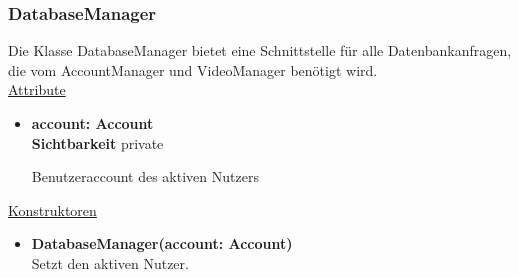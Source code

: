 \subsubsection{DatabaseManager} \label{service:klasse:DatabaseManager}
Die Klasse DatabaseManager bietet eine Schnittstelle für alle Datenbankanfragen, die vom AccountManager und VideoManager benötigt wird. \hfill\\

\underline{Attribute}
\begin{itemize}
\itemsep0pt
\item \textbf{account: Account} \hfill\\ 
\textbf{Sichtbarkeit} private

Benutzeraccount des aktiven Nutzers
\end{itemize}

\underline{Konstruktoren}
\begin{itemize}
\itemsep0pt
\item \textbf{DatabaseManager(account: Account)} \hfill\\
Setzt den aktiven Nutzer.
\end{itemize}


